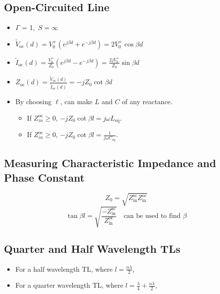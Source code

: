 \documentclass[a4paper]{article}
\begin{document}
\subsection{Open-Circuited Line}
\begin{itemize}
    \item $\Gamma$ = 1,\ $S = \infty$
    \item $\widetilde{V}_\text{oc}(d) = V_0^+\left(e^{j\beta d}+e^{-j\beta d}\right) = 2V_0^+\cos\beta d$
    \item $\widetilde{I}_\text{oc}(d) = \displaystyle\frac{V_0^+}{Z_0}\left(e^{j\beta d}-e^{-j\beta d}\right) = \displaystyle\frac{2jV_0^+}{Z_0}\sin\beta d$
    \item $Z_\text{oc}(d) = \displaystyle\frac{\widetilde{V}_\text{oc}(d)}{\widetilde{I}_\text{oc}(d)} = -jZ_0\cot\beta d$
    \item By choosing $\ell$, can make $L$ and $C$ of any reactance.
    \begin{itemize}[label=$\circ$]
        \item If $Z^\text{oc}_{in} \geq 0$, $-jZ_0\cot\beta l = j\omega L_\text{eq}$.
        \item If $Z^\text{oc}_{in} \geq 0$, $-jZ_0\cot\beta l = \displaystyle\frac{1}{j\omega C_\text{eq}}$.
    \end{itemize}
\end{itemize}

\subsection{Measuring Characteristic Impedance and Phase Constant}
$$Z_0 = \sqrt{Z^\text{sc}_\text{in}Z^\text{oc}_\text{in}}$$
$$\tan\beta l = \sqrt{\frac{-Z^\text{sc}_\text{in}}{Z^\text{oc}_\text{in}}}\quad \text{can be used to find }\beta$$

\subsection{Quarter and Half Wavelength TLs}
\begin{itemize}
    \item For a half wavelength TL, where $l = \displaystyle\frac{n\lambda}{2}$, 
    \item For a quarter wavelength TL, where $l = \displaystyle\frac{\lambda}{4}+\frac{n\lambda}{2}$, 
\end{itemize}
\end{document}

